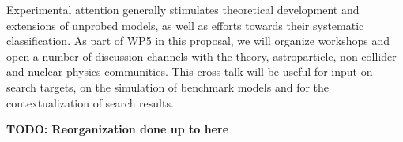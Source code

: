 Experimental attention generally stimulates theoretical development and extensions of unprobed models, as well as efforts towards their systematic classification. 
As part of WP5 in this proposal, we will organize workshops and open a number of discussion channels with the theory, astroparticle, non-collider and nuclear physics communities. 
This cross-talk will be useful for input on search targets, on the simulation of benchmark models and for the contextualization of search results.

\color{red}\textbf{TODO: Reorganization done up to here}\color{black}
